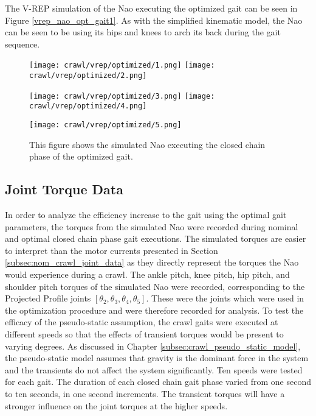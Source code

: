 The V-REP simulation of the Nao executing the optimized gait can be seen in
Figure \ref{vrep_nao_opt_gait1}. As with the
simplified kinematic model, the Nao can be seen to be using its hips and knees to arch its back during the gait sequence.

\begin{figure}
  \centerline{
    \texttt{[image: crawl/vrep/optimized/1.png]}
    \texttt{[image: crawl/vrep/optimized/2.png]}
  }
  \centerline{
    \texttt{[image: crawl/vrep/optimized/3.png]}
    \texttt{[image: crawl/vrep/optimized/4.png]}
  }
  \centerline{
    \texttt{[image: crawl/vrep/optimized/5.png]}
  }
  \caption{This figure shows the simulated Nao executing the closed chain phase of the
           optimized gait.}
  \label{fig:vrep_nao_opt_gait1}
\end{figure}

\subsection{Joint Torque Data} \label{subsec:opt_joint_torque_data}

In order to analyze the efficiency increase to the gait using the optimal gait parameters,
the torques from the simulated Nao were recorded during nominal and optimal closed chain
phase gait executions. The simulated torques are easier to interpret than the motor currents
presented in Section \ref{subsec:nom_crawl_joint_data} as they directly represent the torques
the Nao would experience during a crawl. The ankle pitch, knee pitch, hip pitch, and shoulder pitch
torques of the simulated Nao were recorded, corresponding to the Projected Profile joints 
$[\theta_2, \theta_3, \theta_4, \theta_5]$. These were the joints which were used in the optimization
procedure and were therefore recorded for analysis.
To test the efficacy of the pseudo-static assumption, the crawl gaits were executed at different
speeds so that the effects of transient torques would be present to varying degrees.
As discussed in Chapter \ref{subsec:crawl_pseudo_static_model}, the pseudo-static
model assumes that gravity is the dominant force in the system and the  transients
do not affect the system significantly.
Ten speeds were tested for each gait. The duration of each closed chain gait phase varied from one second to
ten seconds, in one second increments. The transient torques will have a stronger influence
on the joint torques at the higher speeds.

